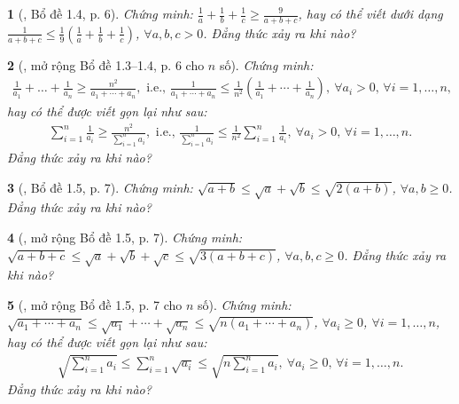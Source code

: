 \documentclass{article}
\newtheorem{baitoan}{}
\begin{document}
\begin{baitoan}[\cite{Son_Nghiep_Trung_Can_bdt}, Bổ đề 1.4, p. 6]
	Chứng minh: $\frac{1}{a} + \frac{1}{b} + \frac{1}{c}\ge\frac{9}{a + b + c}$, hay có thể viết dưới dạng $\frac{1}{a + b + c}\le\frac{1}{9}\left(\frac{1}{a} + \frac{1}{b} + \frac{1}{c}\right)$, $\forall a,b,c > 0$. Đẳng thức xảy ra khi nào?
\end{baitoan}

\begin{baitoan}[\cite{Son_Nghiep_Trung_Can_bdt}, mở rộng Bổ đề 1.3--1.4, p. 6 cho $n$ số]
	Chứng minh:
	\begin{align*}
		\frac{1}{a_1} + \ldots + \frac{1}{a_n}\ge\frac{n^2}{a_1 + \cdots + a_n},\mbox{ i.e., }\frac{1}{a_1 + \cdots + a_n}\le\frac{1}{n^2}\left(\frac{1}{a_1} + \cdots + \frac{1}{a_n}\right),\ \forall a_i > 0,\,\forall i = 1,\ldots,n,
	\end{align*}
	hay có thể được viết gọn lại như sau:
	\begin{align*}
		\sum_{i=1}^{n} \frac{1}{a_i}\ge\frac{n^2}{\sum_{i=1}^n a_i},\mbox{ i.e., }\frac{1}{\sum_{i=1}^n a_i}\le\frac{1}{n^2}\sum_{i=1}^n \frac{1}{a_i},\ \forall a_i > 0,\,\forall i = 1,\ldots,n.
	\end{align*}
	Đẳng thức xảy ra khi nào?
\end{baitoan}

\begin{baitoan}[\cite{Son_Nghiep_Trung_Can_bdt}, Bổ đề 1.5, p. 7]
	Chứng minh: $\sqrt{a + b}\le\sqrt{a} + \sqrt{b}\le\sqrt{2(a + b)}$, $\forall a,b\ge 0$. Đẳng thức xảy ra khi nào?
\end{baitoan}

\begin{baitoan}[\cite{Son_Nghiep_Trung_Can_bdt}, mở rộng Bổ đề 1.5, p. 7]
	Chứng minh: $\sqrt{a + b + c}\le\sqrt{a} + \sqrt{b} + \sqrt{c}\le\sqrt{3(a + b + c)}$, $\forall a,b,c\ge 0$. Đẳng thức xảy ra khi nào?
\end{baitoan}

\begin{baitoan}[\cite{Son_Nghiep_Trung_Can_bdt}, mở rộng Bổ đề 1.5, p. 7 cho $n$ số]
	Chứng minh: $\sqrt{a_1 + \cdots + a_n}\le\sqrt{a_1} + \cdots + \sqrt{a_n}\le\sqrt{n(a_1 + \cdots + a_n)}$, $\forall a_i\ge 0$, $\forall i = 1,\ldots,n$, hay có thể được viết gọn lại như sau:
	\begin{align*}
		\sqrt{\sum_{i=1}^n a_i}\le\sum_{i=1}^n \sqrt{a_i}\le\sqrt{n\sum_{i=1}^n a_i},\ \forall a_i\ge 0,\,\forall i = 1,\ldots,n.
	\end{align*}
	Đẳng thức xảy ra khi nào?
\end{baitoan}
\end{document}

